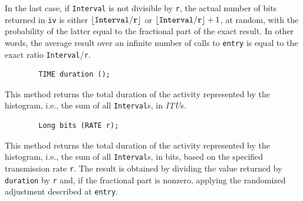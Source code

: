 In the last case,
if {\tt Interval} is not divisible by {\tt r}, the actual number of bits
returned in {\tt iv} is either
$\lfloor {\tt Interval}/{\tt r} \rfloor$ or
$\lfloor {\tt Interval}/{\tt r} \rfloor + 1$,
at random, with the probability of the latter
equal to the fractional part of the exact result.
In other words, the average result over an infinite number of calls to
{\tt entry} is equal to the exact ratio {\tt Interval}/{\tt r}.

\begin{verbatim}
        TIME duration ();
\end{verbatim}
\noindent
This method returns the total duration of the activity represented by the
histogram, i.e., the sum of all {\tt Interval}s, in {\em ITU\/}s.

\begin{verbatim}
        Long bits (RATE r);
\end{verbatim}
\noindent
This method returns the total duration of the activity represented by the
histogram, i.e., the sum of all {\tt Interval}s, in bits, based on the specified
transmission rate {\tt r}.
The result is obtained by dividing the value returned by {\tt duration} by
{\tt r} and, if the fractional part is nonzero, applying
the randomized adjustment described at {\tt entry}.

